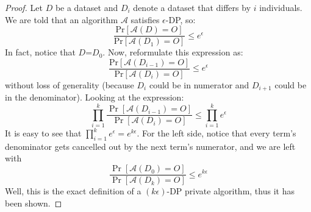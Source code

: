 \documentclass[12pt,reqno]{amsart}
\newcommand{\pr}[0]{\text{Pr}}
\newcommand{\advrs}[0]{\mathcal{A}}
\begin{document}
\begin{enumerate}[label=(\alph*)]
\begin{proof}
Let $D$ be a dataset and $D_i$ denote a dataset that differs by $i$ individuals. We are told that an algorithm $\advrs$ satisfies $\epsilon$-DP, so:
$$
\frac{\pr[\advrs(D)=O]}{\pr[\advrs(D_1)=O]} \leq e^{\epsilon}
$$
In fact, notice that $D$=$D_0$. Now, reformulate this expression as:
$$
\frac{\pr[\advrs(D_{i-1})=O]}{\pr[\advrs(D_{i})=O]} \leq e^{\epsilon}
$$
without loss of generality (because $D_i$ could be in numerator and $D_{i+1}$ could be in the denominator). Looking at the expression:
$$
\prod_{i=1}^{k}\frac{\Pr[\advrs(D_{i-1})=O]}{\Pr[\advrs(D_{i})=O]} \leq \prod_{i=1}^{k}e^{\epsilon}
$$
It is easy to see that $\prod_{i=1}^{k}e^{\epsilon} = e^{k\epsilon}$. For the left side, notice that every term's denominator gets cancelled out by the next term's numerator, and we are left with
$$
\frac{\Pr[\advrs(D_{0})=O]}{\Pr[\advrs(D_{k})=O]} \leq e^{k\epsilon}
$$
Well, this is the exact definition of a $(k\epsilon)$-DP private algorithm, thus it has been shown.
\end{proof}
\end{enumerate}
\end{document}
